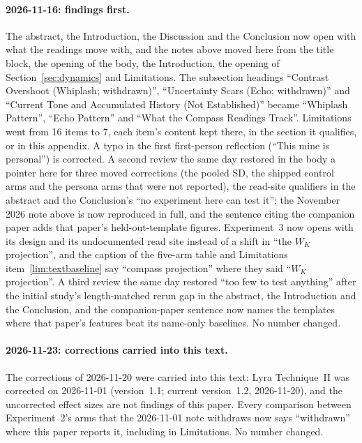 \documentclass[11pt,a4paper]{article}
\begin{document}
\paragraph{2026-11-16: findings first.} The abstract, the
Introduction, the Discussion and the Conclusion now open with what the
readings move with, and the notes above moved here from the title
block, the opening of the body, the Introduction, the opening of
Section~\ref{sec:dynamics} and Limitations. The subsection headings
``Contrast Overshoot (Whiplash; withdrawn)'', ``Uncertainty Scars (Echo;
withdrawn)'' and ``Current Tone and Accumulated History (Not
Established)'' became ``Whiplash Pattern'', ``Echo Pattern'' and ``What
the Compass Readings Track''. Limitations went from 16 items to 7, each
item's content kept there, in the section it qualifies, or in this
appendix. A typo in the first first-person reflection (``This mine is
personal'') is corrected. A second review the same day restored in the
body a pointer here for three moved corrections (the pooled SD, the
shipped control arms and the persona arms that were not reported), the
read-site qualifiers in the abstract and the Conclusion's ``no experiment
here can test it''; the November 2026 note above is now reproduced in
full, and the sentence citing the companion paper adds that paper's
held-out-template figures. Experiment~3 now opens with its design and its undocumented read site instead of a shift in ``the $W_K$ projection'', and the caption of the five-arm table and Limitations item~\ref{lim:textbaseline} say ``compass projection'' where they said ``$W_K$ projection''. A third review the same day restored ``too few to test anything'' after the initial study's length-matched rerun gap in the abstract, the Introduction and the Conclusion, and the companion-paper sentence now names the templates where that paper's features beat its name-only baselines. No number changed.

\paragraph{2026-11-23: corrections carried into this text.} The
corrections of 2026-11-20 were carried into this text: Lyra
Technique~II was corrected on 2026-11-01 (version~1.1; current
version~1.2, 2026-11-20), and the uncorrected effect sizes are not
findings of this paper. Every comparison between Experiment~2's arms
that the 2026-11-01 note withdraws now says ``withdrawn'' where this
paper reports it, including in Limitations. No number changed.
\end{document}

